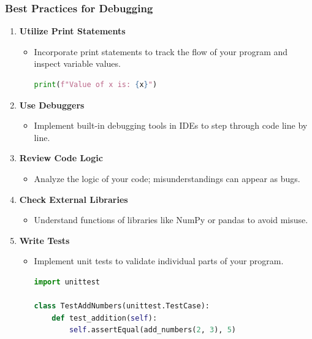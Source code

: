 \documentclass{beamer}
\begin{document}
\begin{frame}[fragile]
    \frametitle{Best Practices for Debugging}
    \begin{enumerate}
        \item \textbf{Utilize Print Statements}
        \begin{itemize}
            \item Incorporate print statements to track the flow of your program and inspect variable values.
            \begin{lstlisting}[language=Python]
print(f"Value of x is: {x}")
            \end{lstlisting}
        \end{itemize}
        
        \item \textbf{Use Debuggers}
        \begin{itemize}
            \item Implement built-in debugging tools in IDEs to step through code line by line.
        \end{itemize}
        
        \item \textbf{Review Code Logic}
        \begin{itemize}
            \item Analyze the logic of your code; misunderstandings can appear as bugs.
        \end{itemize}
        
        \item \textbf{Check External Libraries}
        \begin{itemize}
            \item Understand functions of libraries like NumPy or pandas to avoid misuse.
        \end{itemize}
        
        \item \textbf{Write Tests}
        \begin{itemize}
            \item Implement unit tests to validate individual parts of your program.
            \begin{lstlisting}[language=Python]
import unittest

class TestAddNumbers(unittest.TestCase):
    def test_addition(self):
        self.assertEqual(add_numbers(2, 3), 5)
            \end{lstlisting}
        \end{itemize}
    \end{enumerate}
\end{frame}
\end{document}
